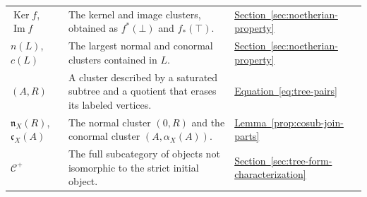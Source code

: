 \documentclass[11pt,a4paper]{article}
\theoremstyle{plain}
\theoremstyle{definition}
\theoremstyle{remark}
\begin{document}
\begin{longtable}{@{}>{\raggedright\arraybackslash}p{}
                    >{\raggedright\arraybackslash}p{}
                    >{\raggedright\arraybackslash}p{}@{}}
$\operatorname{Ker}f$, $\operatorname{Im}f$ & The kernel and
  image clusters, obtained as $f^*(\bot)$ and $f_*(\top)$.
  & \hyperref[not:form-kernel-image]{Section~\ref*{sec:noetherian-property}}\\
$n(L)$, $c(L)$ & The largest normal and conormal clusters
  contained in $L$.
  & \hyperref[not:normal-conormal-parts]{Section~\ref*{sec:noetherian-property}}\\
$(A,R)$ & A cluster described by a saturated subtree and a
  quotient that erases its labeled vertices.
  & \hyperref[eq:tree-pairs]{Equation~\ref*{eq:tree-pairs}}\\
$\mathfrak n_X(R)$, $\mathfrak c_X(A)$ & The normal cluster
  $(0,R)$ and the conormal cluster $(A,\alpha_X(A))$.
  & \hyperref[prop:cosub-join-parts]{Lemma~\ref*{prop:cosub-join-parts}}\\
$\mathcal C^+$ & The full subcategory of objects not isomorphic
  to the strict initial object.
  & \hyperref[not:nonempty-subcategory]{Section~\ref*{sec:tree-form-characterization}}\\
\end{longtable}
\endgroup
\end{document}
